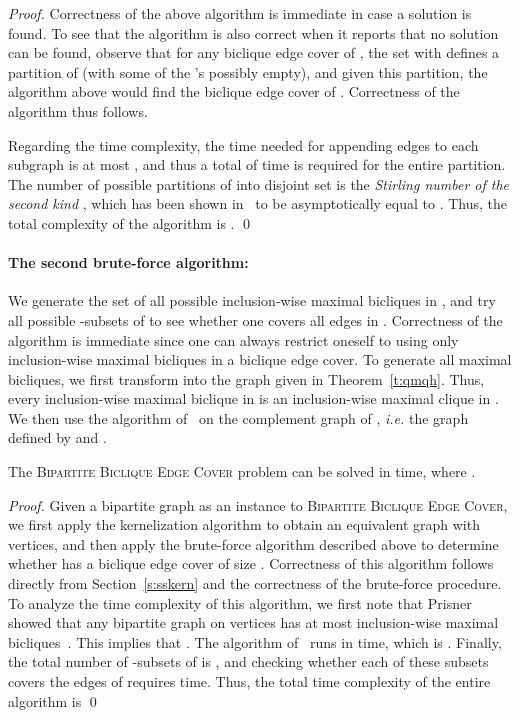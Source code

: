 \begin{proof}
Correctness of the above algorithm is immediate in case a
solution is found. To see that the algorithm is also correct
when it reports that no solution can be found, observe that for
any biclique edge cover  of , the set
 with  defines a partition of  (with some of the 's
possibly empty), and given this partition, the algorithm above
would find the biclique edge cover of . Correctness of the
algorithm thus follows.

Regarding the time complexity, the time needed for appending
edges to each subgraph is at most , and thus
a total of  time is required for the entire partition. The 
number of possible partitions of  into  disjoint set
is the \emph{Stirling number of the second kind} ,
which has been shown in~\cite{Korshunov1983} to be
asymptotically equal to
. Thus, the 
total complexity of the algorithm is . 
\qed
\end{proof}


\paragraph{The second brute-force algorithm:}
We generate
the set  of all possible inclusion-wise maximal
bicliques in , and try all possible -subsets of
 to see whether one covers all edges in .
Correctness of the algorithm is immediate
since one can always restrict oneself to using only
inclusion-wise maximal bicliques in a biclique
edge cover. To generate all maximal
bicliques, we first transform  into the graph  given in
Theorem~\ref{t:qmqh}. Thus, every
inclusion-wise maximal biclique in  is an inclusion-wise
maximal clique in . We then use the algorithm
of~\cite{TsukiyamaIdeAriyoshiShirakawa1977} on the complement
graph  of , \emph{i.e.} the graph defined
by  and .

\begin{theorem}
The \textsc{Bipartite Biclique Edge Cover} problem can be
solved in  time, where .
\end{theorem}

\begin{proof}
Given a bipartite graph  as an instance to \textsc{Bipartite
Biclique Edge Cover}, we first apply the kernelization algorithm
to obtain an equivalent graph  with  vertices, and then apply the brute-force algorithm
described above to determine whether  has a biclique edge
cover of size . Correctness of this algorithm follows
directly from Section~\ref{s:sskern} and the correctness of
the brute-force procedure. To analyze the time complexity of
this algorithm, we first note that Prisner showed that any
bipartite graph on  vertices has at most 
inclusion-wise maximal
bicliques~\cite{TsukiyamaIdeAriyoshiShirakawa1977}. This
implies that . The
algorithm of~\cite{Prisner2000} runs in
 time, which is
. Finally, the total
number of -subsets of  is
, and checking whether each of these subsets
covers the edges of  requires 
time. Thus, the total time complexity of the entire algorithm
is  \qed
\end{proof}

